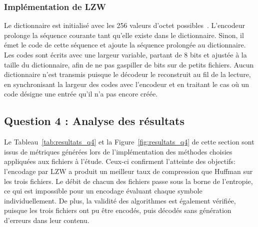 \documentclass[12pt,letterpaper]{article}
\begin{document}
\subsubsection*{Implémentation de LZW}

Le dictionnaire est initialisé avec les 256 valeurs d'octet possibles~\cite{welch1984}.
L'encodeur prolonge la séquence courante tant qu'elle existe dans le dictionnaire. 
Sinon, il émet le code de cette séquence et ajoute la séquence prolongée au dictionnaire.
Les codes sont écrits avec une largeur variable, partant de 8 bits et ajustée à la taille du dictionnaire, afin de ne pas gaspiller de bits sur de petits fichiers.
Aucun dictionnaire n'est transmis puisque le décodeur le reconstruit au fil de la lecture, en synchronisant la largeur des codes avec l'encodeur et en traitant le cas où un code désigne une entrée qu'il n'a pas encore créée.


\subsection{Question 4 : Analyse des résultats}
\label{subsec:q4}

Le Tableau~\ref{tab:resultats_q4} et la Figure~\ref{fig:resultats_q4} de cette section sont issus de métriques générées lors de l'implémentation des méthodes choisies appliquées aux fichiers à l'étude. 
Ceux-ci confirment l'atteinte des objectifs: l'encodage par LZW a produit un meilleur taux de compression que Huffman sur les trois fichiers.
Le débit de chacun des fichiers passe sous la borne de l'entropie, ce qui est impossible pour un encodage évaluant chaque symbole individuellement.
De plus, la validité des algorithmes est également vérifiée, puisque les trois fichiers ont pu être encodés, puis décodés sans génération d'erreurs dans leur contenu.

\begin{table}[htbp]
    \centering
    \small
    \caption{Résultats de compression de Huffman et LZW sur les trois fichiers.}
    \label{tab:resultats_q4}
\end{table}
\end{document}
